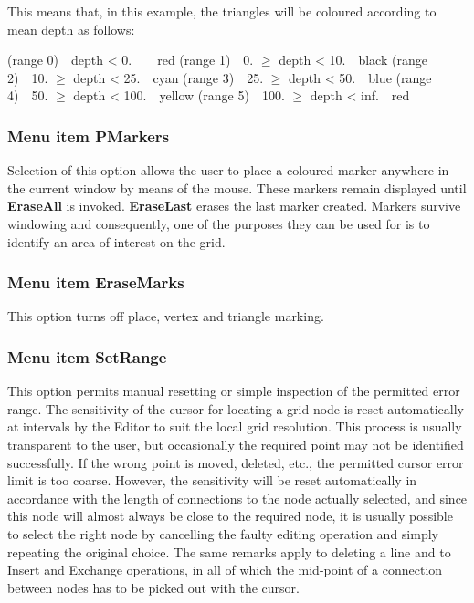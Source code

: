 \documentclass{article}
\begin{document}
This means that, in this example, the triangles will be coloured according to mean depth as follows:

(range 0)\ \ depth {\textless} 0.\ \ \ \ red\newline
(range 1)\ \ 0. ${\geq}$ depth {\textless} 10.\ \ black\newline
(range 2)\ \ 10. ${\geq}$ depth {\textless} 25.\ \ cyan\newline
(range 3)\ \ 25. ${\geq}$ depth {\textless} 50.\ \ blue\newline
(range 4)\ \ 50. ${\geq}$ depth {\textless} 100.\ \ yellow\newline
(range 5)\ \ 100. ${\geq}$ depth {\textless} inf.\ \ red

\subsubsection{Menu item PMarkers}
Selection of this option allows the user to place a coloured marker anywhere in the current window by means of the mouse. These markers remain displayed until \textbf{EraseAll} is invoked. \textbf{EraseLast} erases the last marker created. Markers survive windowing and consequently, one of the purposes they can be used for is to identify an area of interest on the grid.

\subsubsection{Menu item EraseMarks}
This option turns off place, vertex and triangle marking.

\subsubsection[Menu item CursorRange]{Menu item SetRange}
This option permits manual resetting or simple inspection of the permitted error range. The sensitivity of the cursor for locating a grid node is reset automatically at intervals by the Editor to suit the local grid resolution. This process is usually transparent to the user, but occasionally the required point may not be identified successfully. If the wrong point is moved, deleted, etc., the permitted cursor error limit is too coarse. However, the sensitivity will be reset automatically in accordance with the length of connections to the node actually selected, and since this node will almost always be close to the required node, it is usually possible to select the right node by cancelling the faulty editing operation and simply repeating the original choice. The same remarks apply to deleting a line and to Insert and Exchange operations, in all of which the mid-point of a connection between nodes has to be picked out with the cursor.
\end{document}
